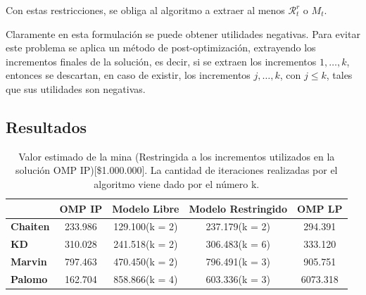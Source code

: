 \documentclass[12pt,letterpaper]{article}
\newcommand\mR{\mathcal{R}}
\begin{document}
Con estas restricciones, se obliga al algoritmo a extraer al menos $\mR_t^r$ o $M_t$.

Claramente en esta formulación se puede obtener utilidades negativas. Para evitar este problema se aplica un método de post-optimización, extrayendo los incrementos finales de la solución, es decir, si se extraen los incrementos $1,\dotsc,k$, entonces se descartan, en caso de existir, los incrementos $j,\dotsc,k$, con $j\leq k$, tales que sus utilidades son negativas.

\subsection{Resultados}

\begin{table}[H]
\centering
\begin{tabular}{|l|cccc|}
\hline
                 & \textbf{OMP IP} & \textbf{Modelo Libre} & \textbf{Modelo Restringido} & \textbf{OMP LP} \\ \hline
\textbf{Chaiten} & 233.986                   & 129.100(k = 2)               & 237.179(k = 2)                     & 294.391                    \\ \hline
\textbf{KD}      & 310.028                   & 241.518(k = 2)               & 306.483(k = 6)                    & 333.120                    \\ \hline
\textbf{Marvin}  & 797.463                   & 470.450(k = 2)               & 796.491(k = 3)                     & 905.751                    \\ \hline
\textbf{Palomo}  & 162.704                   & 858.866(k = 4)               & 603.336(k = 3)                    & 6073.318                   \\ \hline
\end{tabular}
\caption{Valor estimado de la mina (Restringida a los incrementos utilizados en la solución OMP IP)[\$1.000.000]. La cantidad de iteraciones realizadas por el algoritmo viene dado por el número k.}
\end{table}
\end{document}
